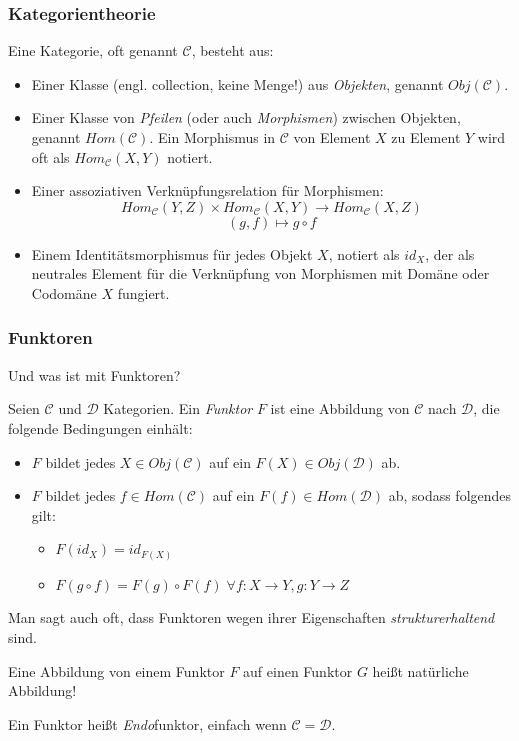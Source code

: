 \documentclass{beamer}
\begin{document}
\begin{frame}
\frametitle{Kategorientheorie}

Eine Kategorie, oft genannt $\mathcal{C}$, besteht aus:
\begin{itemize}
\pause\item Einer Klasse (engl. \glqq collection\grqq , keine Menge!) aus \emph{Objekten}, genannt $Obj(\mathcal{C})$.
\pause\item Einer Klasse von \emph{Pfeilen} (oder auch \emph{Morphismen}) zwischen Objekten, genannt $Hom(\mathcal{C})$. Ein Morphismus in $\mathcal{C}$ von Element $X$ zu Element $Y$ wird oft als $Hom_\mathcal{C}(X,Y)$ notiert.
\pause\item Einer assoziativen Verknüpfungsrelation für Morphismen:
$$Hom_\mathcal{C}(Y,Z) \times Hom_\mathcal{C}(X,Y) \to Hom_\mathcal{C}(X,Z)$$
$$(g,f) \mapsto g \circ f$$
\pause\item Einem Identitätsmorphismus für jedes Objekt $X$, notiert als $id_X$, der als neutrales Element für die Verknüpfung von Morphismen mit Domäne oder Codomäne $X$ fungiert.
\end{itemize}
\end{frame}


\begin{frame}
\frametitle{Funktoren}
Und was ist mit Funktoren?\pause\bigskip

Seien $\mathcal{C}$ und $\mathcal{D}$ Kategorien. Ein \emph{Funktor} $F$ ist eine Abbildung
von $\mathcal{C}$ nach $\mathcal{D}$, die folgende Bedingungen einhält:

\begin{itemize}
\pause \item $F$ bildet jedes $X \in Obj(\mathcal{C})$ auf ein $F(X) \in Obj(\mathcal{D})$ ab.
\pause \item $F$ bildet jedes $f \in Hom(\mathcal{C})$ auf ein $F(f) \in Hom(\mathcal{D})$ ab, sodass folgendes gilt:
\begin{itemize}
\pause \item $F(id_X) = id_{F(X)}$
\pause \item $F(g \circ f) = F(g) \circ F(f) \; \forall f: X \to Y, g : Y \to Z$
\end{itemize}
\end{itemize}
\pause\bigskip

Man sagt auch oft, dass Funktoren wegen ihrer Eigenschaften \emph{strukturerhaltend} sind.\pause\smallskip

Eine Abbildung von einem Funktor $F$ auf einen Funktor $G$ heißt \glqq natürliche Abbildung\grqq !
\pause\smallskip

Ein Funktor heißt \emph{Endo}funktor, einfach wenn $\mathcal{C} = \mathcal{D}$.

\end{frame}
\end{document}
